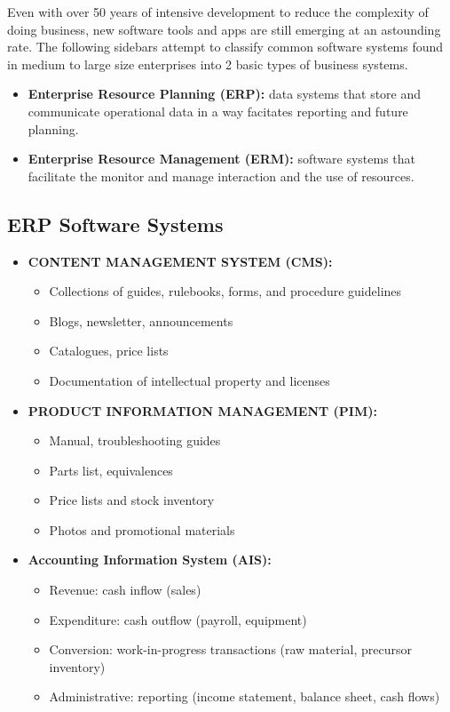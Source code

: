 \documentclass[]{book}
\providecommand{\tightlist}{%
  \setlength{\itemsep}{0pt}\setlength{\parskip}{0pt}}
\let\BeginKnitrBlock\begin \let\EndKnitrBlock\end
\begin{document}
Even with over 50 years of intensive development to reduce the complexity of doing business, new software tools and apps are still emerging at an astounding rate. The following sidebars attempt to classify common software systems found in medium to large size enterprises into 2 basic types of business systems.

\begin{itemize}
\item
  \textbf{Enterprise Resource Planning (ERP):} data systems that store and communicate operational data in a way facitates reporting and future planning.
\item
  \textbf{Enterprise Resource Management (ERM):} software systems that facilitate the monitor and manage interaction and the use of resources.
\end{itemize}

\BeginKnitrBlock{rmdextra}
\hypertarget{erp-software-systems}{%
\section*{ERP Software Systems}\label{erp-software-systems}}

\begin{itemize}
\item
  \textbf{CONTENT MANAGEMENT SYSTEM (CMS):}

  \begin{itemize}
  \tightlist
  \item
    Collections of guides, rulebooks, forms, and procedure guidelines
  \item
    Blogs, newsletter, announcements
  \item
    Catalogues, price lists
  \item
    Documentation of intellectual property and licenses
  \end{itemize}
\item
  \textbf{PRODUCT INFORMATION MANAGEMENT (PIM):}

  \begin{itemize}
  \tightlist
  \item
    Manual, troubleshooting guides
  \item
    Parts list, equivalences
  \item
    Price lists and stock inventory
  \item
    Photos and promotional materials
  \end{itemize}
\item
  \textbf{Accounting Information System (AIS):}

  \begin{itemize}
  \tightlist
  \item
    Revenue: cash inflow (sales)
  \item
    Expenditure: cash outflow (payroll, equipment)
  \item
    Conversion: work-in-progress transactions (raw material, precursor inventory)
  \item
    Administrative: reporting (income statement, balance sheet, cash flows)
  \end{itemize}
\end{itemize}
\EndKnitrBlock{rmdextra}
\end{document}
